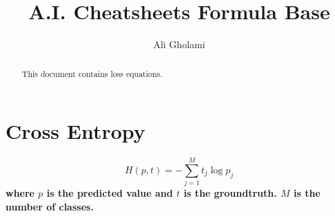 \documentclass{article}
\begin{document}
\title{A.I. Cheatsheets Formula Base}
\author{Ali Gholami}

\maketitle

\begin{abstract}
This document contains loss equations.
\end{abstract}

\section{Cross Entropy}

$$
    H(p, t) = - \sum_{j=1}^{M} t_j \log p_j
$$
\textbf{where $p$ is the predicted value and $t$ is the groundtruth. $M$ is the number of classes.}
\end{document}
